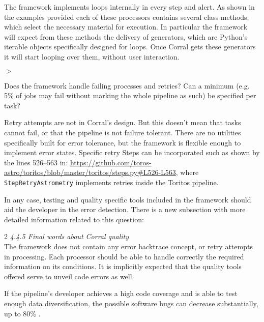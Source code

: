 \documentclass[a4paper,onecolumn,fleqn,usenatbib,useAMS]{mnrasr}
\newenvironment{frshaded}{%
\def\FrameCommand{\fboxrule=\FrameRule\fboxsep=\FrameSep \fcolorbox{framecolor}{shadecolor}}%
\MakeFramed {\FrameRestore}}%
{\endMakeFramed}
\newenvironment{myindentpar}[1]%
 {\begin{list}{}%
         \bigskip
         \color{refereecolor}
         {\setlength{\leftmargin}{#1}}%
         \itshape
         \item[$>$]%
 }
 {\end{list}}
\begin{document}
%
The framework implements loops internally in every step and alert.
%
As shown in the examples provided each of these processors contains
several class methods, which select the necessary material for execution.
%
In particular the framework will expect from these methods the
delivery of generators, which are Python's iterable objects specifically designed
for loops. 
%
Once Corral gets these generators it will start looping over them, 
without user interaction.

\begin{myindentpar}{1cm}
Does the framework handle failing processes and retries? Can a
minimum (e.g. 5\% of jobs may fail without marking the whole pipeline
as such) be specified per task?

\end{myindentpar}

%
Retry attempts are not in Corral's design. 
%
But this doesn't mean that tasks cannot fail, 
or that the pipeline is not failure tolerant.
%
There are no utilities specifically built for error tolerance, 
but the framework is flexible enough to implement error states. 
Specific retry Steps can be incorporated such as shown by the lines 526--563 in:
\url{https://github.com/toros-astro/toritos/blob/master/toritos/steps.py#L526-L563},
where \verb|StepRetryAstrometry| implements retries inside the Toritos pipeline.

In any case, testing and quality specific tools included in the framework 
should aid the developer in the error detection. 
%
There is a new subsection with more detailed information related to this question:

\begin{frshaded}
\begin{multicols}{2} 
\textit{4.4.5 Final words about Corral quality}\\
The framework does not contain any error backtrace concept, or retry attempts in
processing. Each processor should be able to handle correctly the required information on its conditions.
It is implicitly expected that the quality tools offered serve to unveil code errors as well.

If the pipeline's developer achieves a high code coverage and is able to test enough data
diversification, the possible software bugs can decrease substantially, up to 80\% \citep{jeffries2007guest}.

\end{multicols} \end{frshaded} 
\end{document}

